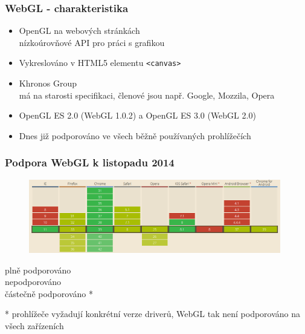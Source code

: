 \documentclass{beamer}
\begin{document}
	
	\begin{frame}[t,fragile]
		\frametitle{WebGL - charakteristika}
		
		\begin{itemize}
			\item OpenGL na webových stránkách \\
				\footnotesize{nízkoúrovňové API pro práci s grafikou}
			\item \large{Vykreslováno v HTML5 elementu} \verb|<canvas>|
			\item \large{Khronos Group} \\
				\footnotesize{má na starosti specifikaci, členové jsou např. Google, Mozzila, Opera}
			\item \large{OpenGL ES 2.0 (WebGL 1.0.2) a OpenGL ES 3.0 (WebGL 2.0)}
			\item Dnes již podporováno ve všech běžně používaných prohlížečích
		\end{itemize}		
		
	\end{frame}



	

	\begin{frame}[t,fragile]
		\frametitle{Podpora WebGL k listopadu 2014}
		
		\linebreak
		
		\centering
		\begin{figure}		
		\includegraphics[width=110mm]{img/webglsupport.png}
		\end{figure}
		\textcolor{ggreen}{plně podporováno} \\
		\textcolor{gred}{nepodporováno} \\
		\textcolor{glime}{částečně podporováno} *
		
	
		\flushleft
* \footnotesize{prohlížeče vyžadují konkrétní verze driverů, WebGL tak není podporováno na všech zařízeních}
			

	\end{frame}
	
\end{document}
